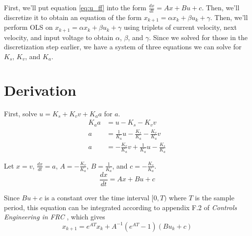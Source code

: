 \documentclass[10pt,conference,compsoc]{IEEEtran}
\begin{document}
First, we'll put equation \eqref{eq:u_ff} into the form
$\frac{dx}{dt} = Ax + Bu + c$. Then, we'll discretize it to obtain an equation
of the form $x_{k+1} = \alpha x_k + \beta u_k + \gamma$. Then, we'll perform OLS
on $x_{k+1} = \alpha x_k + \beta u_k + \gamma$ using triplets of current
velocity, next velocity, and input voltage to obtain $\alpha$, $\beta$, and
$\gamma$. Since we solved for those in the discretization step earlier, we have
a system of three equations we can solve for $K_s$, $K_v$, and $K_a$.

\section{Derivation}

First, solve $u = K_s + K_v v + K_a a$ for $a$.
\begin{align*}
  K_a a &= u - K_s - K_v v \\
  a &= \frac{1}{K_a} u - \frac{K_s}{K_a} - \frac{K_v}{K_a} v \\
  a &= -\frac{K_v}{K_a} v + \frac{1}{K_a} u - \frac{K_s}{K_a}
\end{align*}

Let $x = v$, $\frac{dx}{dt} = a$, $A = -\frac{K_v}{K_a}$, $B = \frac{1}{K_a}$,
and $c = -\frac{K_s}{K_a}$.
\begin{equation*}
  \frac{dx}{dt} = Ax + Bu + c
\end{equation*}

Since $Bu + c$ is a constant over the time interval $[0, T)$ where $T$ is the
sample period, this equation can be integrated according to appendix F.2 of
\textit{Controls Engineering in FRC} \cite{bib:controls-in-frc}, which gives
\begin{equation*}
  x_{k+1} = e^{AT} x_k + A^{-1} (e^{AT} - 1) (Bu_k + c)
\end{equation*}
\end{document}
